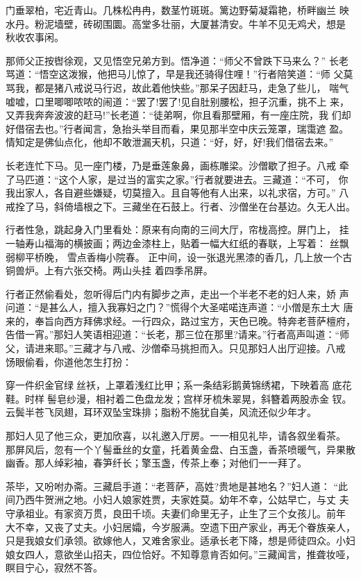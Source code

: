 门垂翠柏，宅近青山。几株松冉冉，数茎竹斑斑。篱边野菊凝霜艳，桥畔幽兰
映水丹。粉泥墙壁，砖砌围圜。高堂多壮丽，大厦甚清安。牛羊不见无鸡犬，想是
秋收农事闲。

那师父正按辔徐观，又见悟空兄弟方到。悟净道：“师父不曾跌下马来么？”
长老骂道：“悟空这泼猴，他把马儿惊了，早是我还骑得住哩！”行者陪笑道：“师
父莫骂我，都是猪八戒说马行迟，故此着他快些。”那呆子因赶马，走急了些儿，
喘气嘘嘘，口里唧唧哝哝的闹道：“罢了!罢了!见自肚别腰松，担子沉重，挑不上
来，又弄我奔奔波波的赶马!”长老道：“徒弟啊，你且看那壁厢，有一座庄院，我
们却好借宿去也。”行者闻言，急抬头举目而看，果见那半空中庆云笼罩，瑞霭遮
盈。情知定是佛仙点化，他却不敢泄漏天机，只道：“好，好，好!我们借宿去来。”

长老连忙下马。见一座门楼，乃是垂莲象鼻，画栋雕梁。沙僧歇了担子。八戒
牵了马匹道：“这个人家，是过当的富实之家。”行者就要进去。三藏道：“不可，
你我出家人，各自避些嫌疑，切莫擅入。且自等他有人出来，以礼求宿，方可。”
八戒拴了马，斜倚墙根之下。三藏坐在石鼓上。行者、沙僧坐在台基边。久无人出。

行者性急，跳起身入门里看处：原来有向南的三间大厅，帘栊高控。屏门上，
挂一轴寿山福海的横披画；两边金漆柱上，贴着一幅大红纸的春联，上写着：
丝飘弱柳平桥晚，
雪点香梅小院春。
正中间，设一张退光黑漆的香几，几上放一个古铜兽炉。上有六张交椅。两山头挂
着四季吊屏。

行者正然偷看处，忽听得后门内有脚步之声，走出一个半老不老的妇人来，娇
声问道：“是甚么人，擅入我寡妇之门？”慌得个大圣喏喏连声道：“小僧是东土大
唐来的，奉旨向西方拜佛求经。一行四众，路过宝方，天色已晚。特奔老菩萨檀府，
告借一宵。”那妇人笑语相迎道：“长老，那三位在那里?请来。”行者高声叫道：“师
父，请进来耶。”三藏才与八戒、沙僧牵马挑担而入。只见那妇人出厅迎接。八戒
饧眼偷看，你道他怎生打扮：

穿一件织金官绿丝袄，上罩着浅红比甲；系一条结彩鹅黄锦绣裙，下映着高
底花鞋。时样髻皂纱漫，相衬着二色盘龙发；宫样牙梳朱翠晃，斜簪着两股赤金
钗。云鬓半苍飞凤翅，耳环双坠宝珠排；脂粉不施犹自美，风流还似少年才。

那妇人见了他三众，更加欣喜，以礼邀入厅房。一一相见礼毕，请各叙坐看茶。
那屏风后，忽有一个丫髻垂丝的女童，托着黄金盘、白玉盏，香茶喷暖气，异果散
幽香。那人绰彩袖，春笋纤长；擎玉盏，传茶上奉；对他们一一拜了。

茶毕，又吩咐办斋。三藏启手道：“老菩萨，高姓?贵地是甚地名？”妇人道：
“此间乃西牛贺洲之地。小妇人娘家姓贾，夫家姓莫。幼年不幸，公姑早亡，与丈
夫守承祖业。有家资万贯，良田千顷。夫妻们命里无子，止生了三个女孩儿。前年
大不幸，又丧了丈夫。小妇居孀，今岁服满。空遗下田产家业，再无个眷族亲人，
只是我娘女们承领。欲嫁他人，又难舍家业。适承长老下降，想是师徒四众。小妇
娘女四人，意欲坐山招夫，四位恰好。不知尊意肯否如何。”三藏闻言，推聋妆哑，
瞑目宁心，寂然不答。

